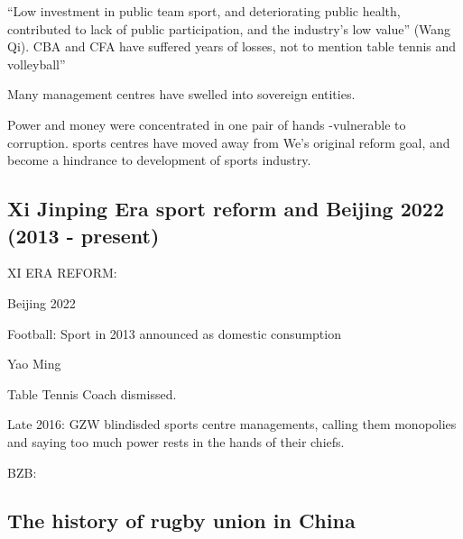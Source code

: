 {    ``Low investment in public team sport, and deteriorating public health, contributed to lack of public participation, and the industry’s low value'' (Wang Qi). CBA and CFA have suffered years of losses, not to mention table tennis and volleyball”

    Many management centres have swelled into sovereign entities.

    Power and money were concentrated in one pair of hands -vulnerable to corruption.  sports centres have moved away from We’s original reform goal, and become a hindrance to development of sports industry.

\subsection{Xi Jinping Era sport reform and Beijing 2022 (2013 - present)}

    XI ERA REFORM:

    Beijing 2022

    Football:
    Sport in 2013 announced as domestic consumption

    Yao Ming

    Table Tennis Coach dismissed.

    Late 2016:  GZW blindisded sports centre managements, calling them monopolies and saying too much power rests in the hands of their chiefs.


    BZB:



  \subsection{The history of rugby union in China}



}
